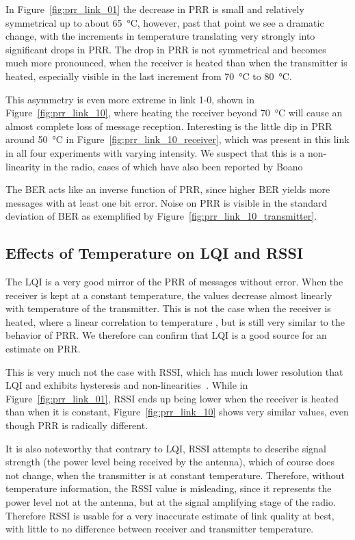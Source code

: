 In Figure~\ref{fig:prr_link_01} the decrease in \ac{PRR} is small and relatively symmetrical up to about \SI{65}{\celsius}, however, past that point we see a dramatic change, with the increments in temperature translating very strongly into significant drops in \ac{PRR}.
The drop in \ac{PRR} is not symmetrical and becomes much more pronounced, when the receiver is heated than when the transmitter is heated, especially visible in the last increment from \SI{70}{\celsius} to \SI{80}{\celsius}.

This asymmetry is even more extreme in link 1-0, shown in Figure~\ref{fig:prr_link_10}, where heating the receiver beyond \SI{70}{\celsius} will cause an almost complete loss of message reception.
Interesting is the little dip in \ac{PRR} around \SI{50}{\celsius} in Figure~\ref{fig:prr_link_10_receiver}, which was present in this link in all four experiments with varying intensity. We suspect that this is a non-linearity in the radio, cases of which have also been reported by Boano~\etal

The \ac{BER} acts like an inverse function of \ac{PRR}, since higher \ac{BER} yields more messages with at least one bit error.
Noise on \ac{PRR} is visible in the standard deviation of \ac{BER} as exemplified by Figure~\ref{fig:prr_link_10_transmitter}.


\subsection{Effects of Temperature on \acs{LQI} and \acs{RSSI}}

The \ac{LQI} is a very good mirror of the \ac{PRR} of messages without error.
When the receiver is kept at a constant temperature, the values decrease almost linearly with temperature of the transmitter.
This is not the case when the receiver is heated, where a linear correlation to temperature , but is still very similar to the behavior of \ac{PRR}.
We therefore can confirm that \ac{LQI} is a good source for an estimate on \ac{PRR}.

This is very much not the case with \ac{RSSI}, which has much lower resolution that \ac{LQI} and exhibits hysteresis and non-linearities~\cite{Boano2013}.
While in Figure~\ref{fig:prr_link_01}, \ac{RSSI} ends up being lower when the receiver is heated than when it is constant, Figure~\ref{fig:prr_link_10} shows very similar values, even though \ac{PRR} is radically different.

It is also noteworthy that contrary to \ac{LQI}, \ac{RSSI} attempts to describe signal strength (\ie the power level being received by the antenna), which of course does not change, when the transmitter is at constant temperature.
Therefore, without temperature information, the \ac{RSSI} value is misleading, since it represents the power level not at the antenna, but at the signal amplifying stage of the radio. 
Therefore \ac{RSSI} is usable for a very inaccurate estimate of link quality at best, with little to no difference between receiver and transmitter temperature.


